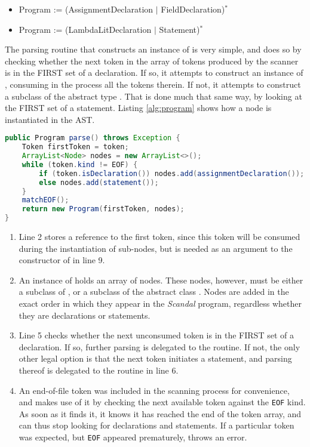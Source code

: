 \begin{itemize}
	\item Program := (AssignmentDeclaration $|$ FieldDeclaration)$^*$
	\item Program := (LambdaLitDeclaration $|$ Statement)$^*$
\end{itemize}

The parsing routine that constructs an instance of  is very simple, and does so by checking whether the next token in the array of tokens produced by the scanner is in the FIRST set of a declaration. If so, it attempts to construct an instance of , consuming in the process all the tokens therein. If not, it attempts to construct a subclass of the abstract type . That is done much that same way, by looking at the FIRST set of a statement. Listing \ref{alg:program} shows how a  node is instantiated in the AST.

\begin{lstlisting}[language=Java,caption={Parsing topmost-level constructs in \emph{Scandal}.},label={alg:program}]
public Program parse() throws Exception {
	Token firstToken = token;
	ArrayList<Node> nodes = new ArrayList<>();
	while (token.kind != EOF) {
		if (token.isDeclaration()) nodes.add(assignmentDeclaration());
		else nodes.add(statement());
	}
	matchEOF();
	return new Program(firstToken, nodes);
}
\end{lstlisting}

\begin{enumerate}
	\addtocounter{enumi}{1}
	\item Line 2 stores a reference to the first token, since this token will be consumed during the instantiation of sub-nodes, but is needed as an argument to the constructor of  in line 9.
	\item An instance of  holds an array of nodes. These nodes, however, must be either a subclass of , or a subclass of the abstract class . Nodes are added in the exact order in which they appear in the \emph{Scandal} program, regardless whether they are declarations or statements.
	\addtocounter{enumi}{1}
	\item Line 5 checks whether the next unconsumed token is in the FIRST set of a declaration. If so, further parsing is delegated to the  routine. If not, the only other legal option is that the next token initiates a statement, and parsing thereof is delegated to the  routine in line 6.
	\addtocounter{enumi}{2}
	\item An end-of-file token was included in the scanning process for convenience, and  makes use of it by checking the next available token against the \texttt{EOF} kind. As soon as it finds it, it knows it has reached the end of the token array, and can thus stop looking for declarations and statements. If a particular token was expected, but \texttt{EOF} appeared prematurely,  throws an error.
\end{enumerate}

